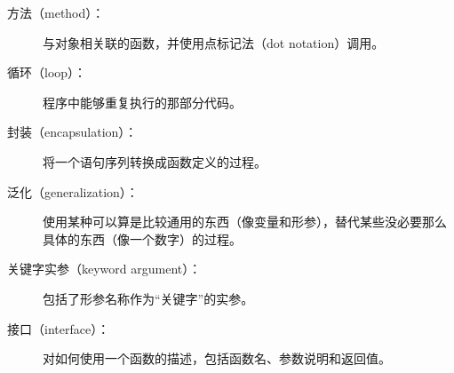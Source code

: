 \begin{description}


\item[方法（method）：]
    与对象相关联的函数，并使用点标记法（dot notation）调用。


\item[循环（loop）：]
    程序中能够重复执行的那部分代码。


\item[封装（encapsulation）：]
    将一个语句序列转换成函数定义的过程。


\item[泛化（generalization）：]
    使用某种可以算是比较通用的东西（像变量和形参），替代某些没必要那么具体的东西（像一个数字）的过程。


\item[关键字实参（keyword argument）：]
    包括了形参名称作为“关键字”的实参。


\item[接口（interface）：]
    对如何使用一个函数的描述，包括函数名、参数说明和返回值。



\end{description}
